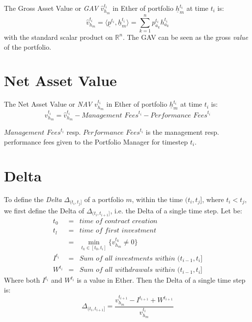 \documentclass[9pt,oneside]{amsart}
\theoremstyle{plain}
\begin{document}
The Gross Asset Value or \textit{GAV} $\hat{v}_{h_m}^{t_i}$ in Ether of portfolio $\underline{h}_m^{t_i}$ at time $t_i$ is:
\begin{equation}
	\hat{v}_{h_m}^{t_i} = \langle \underline{p}^{t_i}, \underline{h}_m^{t_i}\rangle = \sum_{k=1}^{n} p_{a_{k}}^{t_i}h_{a_{k}}^{t_i}
\end{equation}
with the standard scalar product on $\mathbb{R}^n$. The GAV can be seen as the gross \textit{value} of the portfolio.

\section{Net Asset Value}\label{app:defnav}

The Net Asset Value or \textit{NAV} $v_{h_m}^{t_i}$ in Ether of portfolio $\underline{h}_m^{t_i}$ at time $t_i$ is:
\begin{equation}
v_{h_m}^{t_i} = \hat{v}_{h_m}^{t_i} - \textit{Management Fees}^{t_i} - \textit{Performance Fees}^{t_i}
\end{equation}

$\textit{Management Fees}^{t_i}$ resp. $\textit{Performance Fees}^{t_i}$ is the management resp. performance fees given to the Portfolio Manager for timestep $t_i$.

\section{Delta}\label{app:defdelta}

To define the \textit{Delta} $\Delta_{(t_i, t_j]}$ of a portfolio $m$, within the time $(t_i, t_j]$, where $t_i < t_j$, we first define the Delta of $\Delta_{(t_i, t_{i+1}]}$, i.e. the Delta of a single time step.
Let be:
\begin{eqnarray*}
	t_0 &=& \textit{time of contract creation} \\
	t_l &=& \textit{time of first investment} \\
	&=& \min_{t_k \in [t_0, t_i]} \{v_{h_m}^{t_k} \neq 0\} \\
	I^{t_i} &=& \textit{Sum of all investments within $(t_{i-1}, t_i]$} \\
	W^{t_i} &=& \textit{Sum of all withdrawals within $(t_{i-1}, t_i]$}
\end{eqnarray*}
Where both $I^{t_i}$ and $W^{t_i}$ is a value in Ether. Then the Delta of a single time step is:
\begin{equation}
	\Delta_{(t_i, t_{i+1}]} = 
		\frac{v_{h_m}^{t_{i+1}} - 
			I^{t_{i +1}} + W^{t_{i +1}}}{v_{h_m}^{t_i}}
\end{equation}
\end{document}
